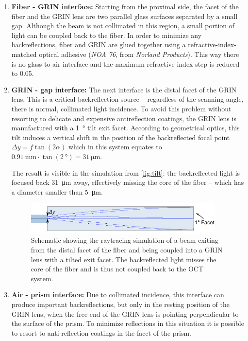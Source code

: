 \begin{enumerate}

\item \textbf{Fiber - GRIN interface:}
Starting from the proximal side, the facet of the fiber and the GRIN lens are two parallel glass surfaces separated by a small gap. Although the beam is not collimated in this region, a small portion of light can be coupled back to the fiber. In order to minimize any backreflections, fiber and GRIN are glued together using a refractive-index-matched optical adhesive (\textit{NOA 76}, from \textit{Norland Products}). This way there is no glass to air interface and the maximum refractive index step is reduced to \SI{0.05}{}.

\item \textbf{GRIN - gap interface:}
The next interface is the distal facet of the GRIN lens. This is a critical backreflection source -- regardless of the scanning angle, there is normal, collimated light incidence. To avoid this problem without resorting to delicate and expensive antireflection coatings, the GRIN lens is manufactured with a \SI{1}{\degree} tilt exit facet. According to geometrical optics, this tilt induces a vertical shift in the position of the backreflected focal point $\Delta y = f \tan(2\alpha)$ which in this system equates to $\SI{0.91}{\milli\meter} \cdot \tan (\SI{2}{\degree}) = \SI{31}{\micro\meter}$.

The result is visible in the simulation from \autoref{fig:tilt}: the backreflected light is focused back \SI{31}{\micro\meter} away, effectively missing the core of the fiber -- which has a diameter smaller than \SI{5}{\micro\meter}.

\begin{figure}[h!]\centering
      \includegraphics[width=10cm]{figures/30_DesignSimulation/Optical/backreflection.pdf}
      \caption{Schematic showing the raytracing simulation of a beam exiting from the distal facet of the fiber and being coupled into a GRIN lens with a tilted exit facet. The backreflected light misses the core of the fiber and is thus not coupled back to the OCT system.}
      \label{fig:tilt}
\end{figure}

\item \textbf{Air - prism interface:} Due to collimated incidence, this interface can produce important backreflections, but only in the resting position of the GRIN lens, when the free end of the GRIN lens is pointing perpendicular to the surface of the prism. To minimize reflections in this situation it is possible to resort to anti-reflection coatings in the facet of the prism. 


\end{enumerate}
